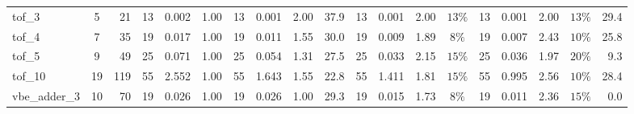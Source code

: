 \begin{table}[H]
\begin{tabular}{l c r | r r r | r r r r | r r r c | r r r c r}
tof\_3 & 5 & 21 & \cellcolor{bestT}13 & 0.002 & 1.00 & \cellcolor{bestT}13 & 0.001 & \cellcolor{bestTime}2.00 & 37.9 & \cellcolor{bestT}13 & 0.001 & \cellcolor{bestTime}2.00 & $13\%$ & \cellcolor{bestT}13 & 0.001 & \cellcolor{bestTime}2.00 & $13\%$ & 29.4 \\
tof\_4 & 7 & 35 & \cellcolor{bestT}19 & 0.017 & 1.00 & \cellcolor{bestT}19 & 0.011 & 1.55 & 30.0 & \cellcolor{bestT}19 & 0.009 & 1.89 & $8\%$ & \cellcolor{bestT}19 & 0.007 & \cellcolor{bestTime}2.43 & $10\%$ & 25.8 \\
tof\_5 & 9 & 49 & \cellcolor{bestT}25 & 0.071 & 1.00 & \cellcolor{bestT}25 & 0.054 & 1.31 & 27.5 & \cellcolor{bestT}25 & 0.033 & \cellcolor{bestTime}2.15 & $15\%$ & \cellcolor{bestT}25 & 0.036 & 1.97 & $20\%$ & 9.3 \\
tof\_10 & 19 & 119 & \cellcolor{bestT}55 & 2.552 & 1.00 & \cellcolor{bestT}55 & 1.643 & 1.55 & 22.8 & \cellcolor{bestT}55 & 1.411 & 1.81 & $15\%$ & \cellcolor{bestT}55 & 0.995 & \cellcolor{bestTime}2.56 & $10\%$ & 28.4 \\
vbe\_adder\_3 & 10 & 70 & \cellcolor{bestT}19 & 0.026 & 1.00 & \cellcolor{bestT}19 & 0.026 & 1.00 & 29.3 & \cellcolor{bestT}19 & 0.015 & 1.73 & $8\%$ & \cellcolor{bestT}19 & 0.011 & \cellcolor{bestTime}2.36 & $15\%$ & 0.0 \\
\bottomrule
\end{tabular}
\end{table}
